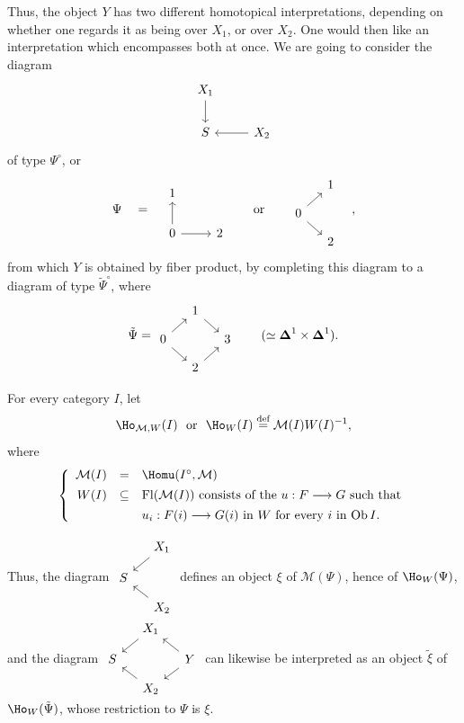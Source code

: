 Thus, the object $Y$ has two different homotopical interpretations, depending on whether one regards it as being over $X_1$, or over $X_2$. One would then like an interpretation which encompasses both at once. We are going to consider the diagram
\[
\begin{tikzcd}[ampersand replacement=\&]
X_1 \arrow[d] \& \\
S \& X_2 \arrow[l]
\end{tikzcd}
\]
of type $\Psi^\circ$, or
\[
\Psi \quad = \quad
\begin{tikzcd}[ampersand replacement=\&]
1 \& \\
0 \arrow[u] \arrow[r] \& 2
\end{tikzcd}
\qquad \text{or} \qquad
\begin{tikzcd}[ampersand replacement=\&, row sep=small, column sep=small]
 \& 1 \\
0 \arrow[ur] \arrow[dr] \& \\
 \& 2
\end{tikzcd}
\quad ,
\]
from which $Y$ is obtained by fiber product, by completing this diagram to a diagram of type $\tilde{\Psi}^\circ$, where
\[
\tilde{\Psi} =
\begin{tikzcd}[ampersand replacement=\&, row sep=small, column sep=small]
 \& 1 \arrow[dr] \& \\
0 \arrow[ur] \arrow[dr] \& \& 3 \\
 \& 2 \arrow[ur] \&
\end{tikzcd}
\qquad (\simeq \boldsymbol{\Delta}^1 \times \boldsymbol{\Delta}^1).
\]

For every category $I$, let
\[
\Ho_{\mathcal{M},W}(I) \text{ \ or \ } \Ho_W(I) \overset{\text{def}}{=} \mathcal{M}(I)W(I)^{-1},
\]
where
\[
\left\{
\begin{array}{rcl}
\mathcal{M}(I) & = & \Homu(I^\circ, \mathcal{M}) \\[1ex]
W(I) & \subseteq & \mathrm{Fl}(\mathcal{M}(I)) \text{ consists of the } u : F \longrightarrow G \text{ such that} \\[1ex]
 & & u_i : F(i) \longrightarrow G(i) \text{ in } W \text{ for every } i \text{ in } \mathrm{Ob}\, I.
\end{array}
\right.
\]

Thus, the diagram $\vcenter{\hbox{\begin{tikzcd}[ampersand replacement=\&, row sep=small, column sep=small]
 \& X_1 \arrow[dl] \\
S \& \\
 \& X_2 \arrow[ul]
\end{tikzcd}}}$ defines an object $\xi$ of $\mathcal{M}(\Psi)$, hence of $\Ho_W(\Psi)$, and the diagram $\vcenter{\hbox{\begin{tikzcd}[ampersand replacement=\&, row sep=small, column sep=small]
 \& X_1 \arrow[dl] \& \\
S \& \& Y \arrow[ul] \arrow[dl] \\
 \& X_2 \arrow[ul] \&
\end{tikzcd}}}$ can likewise be interpreted as an object $\tilde{\xi}$ of $\Ho_W(\tilde{\Psi})$, whose restriction to $\Psi$ is $\xi$.

